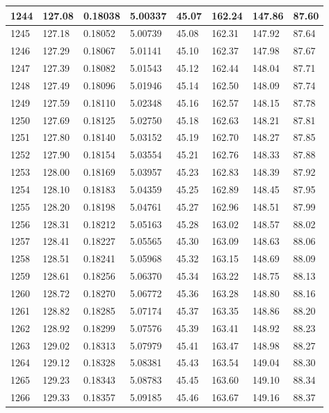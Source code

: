 \documentclass[12pt,a4paper,twoside]{article}
\begin{document}
\begin{center}
\begin{longtable}{l l l l | l l l l}
1244 & 127.08 & 0.18038 & 5.00337 & 45.07 & 162.24 & 147.86 & 87.60 \\ \hline
1245 & 127.18 & 0.18052 & 5.00739 & 45.08 & 162.31 & 147.92 & 87.64 \\ \hline
1246 & 127.29 & 0.18067 & 5.01141 & 45.10 & 162.37 & 147.98 & 87.67 \\ \hline
1247 & 127.39 & 0.18082 & 5.01543 & 45.12 & 162.44 & 148.04 & 87.71 \\ \hline
1248 & 127.49 & 0.18096 & 5.01946 & 45.14 & 162.50 & 148.09 & 87.74 \\ \hline
1249 & 127.59 & 0.18110 & 5.02348 & 45.16 & 162.57 & 148.15 & 87.78 \\ \hline
1250 & 127.69 & 0.18125 & 5.02750 & 45.18 & 162.63 & 148.21 & 87.81 \\ \hline
1251 & 127.80 & 0.18140 & 5.03152 & 45.19 & 162.70 & 148.27 & 87.85 \\ \hline
1252 & 127.90 & 0.18154 & 5.03554 & 45.21 & 162.76 & 148.33 & 87.88 \\ \hline
1253 & 128.00 & 0.18169 & 5.03957 & 45.23 & 162.83 & 148.39 & 87.92 \\ \hline
1254 & 128.10 & 0.18183 & 5.04359 & 45.25 & 162.89 & 148.45 & 87.95 \\ \hline
1255 & 128.20 & 0.18198 & 5.04761 & 45.27 & 162.96 & 148.51 & 87.99 \\ \hline
1256 & 128.31 & 0.18212 & 5.05163 & 45.28 & 163.02 & 148.57 & 88.02 \\ \hline
1257 & 128.41 & 0.18227 & 5.05565 & 45.30 & 163.09 & 148.63 & 88.06 \\ \hline
1258 & 128.51 & 0.18241 & 5.05968 & 45.32 & 163.15 & 148.69 & 88.09 \\ \hline
1259 & 128.61 & 0.18256 & 5.06370 & 45.34 & 163.22 & 148.75 & 88.13 \\ \hline
1260 & 128.72 & 0.18270 & 5.06772 & 45.36 & 163.28 & 148.80 & 88.16 \\ \hline
1261 & 128.82 & 0.18285 & 5.07174 & 45.37 & 163.35 & 148.86 & 88.20 \\ \hline
1262 & 128.92 & 0.18299 & 5.07576 & 45.39 & 163.41 & 148.92 & 88.23 \\ \hline
1263 & 129.02 & 0.18313 & 5.07979 & 45.41 & 163.47 & 148.98 & 88.27 \\ \hline
1264 & 129.12 & 0.18328 & 5.08381 & 45.43 & 163.54 & 149.04 & 88.30 \\ \hline
1265 & 129.23 & 0.18343 & 5.08783 & 45.45 & 163.60 & 149.10 & 88.34 \\ \hline
1266 & 129.33 & 0.18357 & 5.09185 & 45.46 & 163.67 & 149.16 & 88.37 \\ \hline

\end{longtable}
\end{center}
\end{document}
